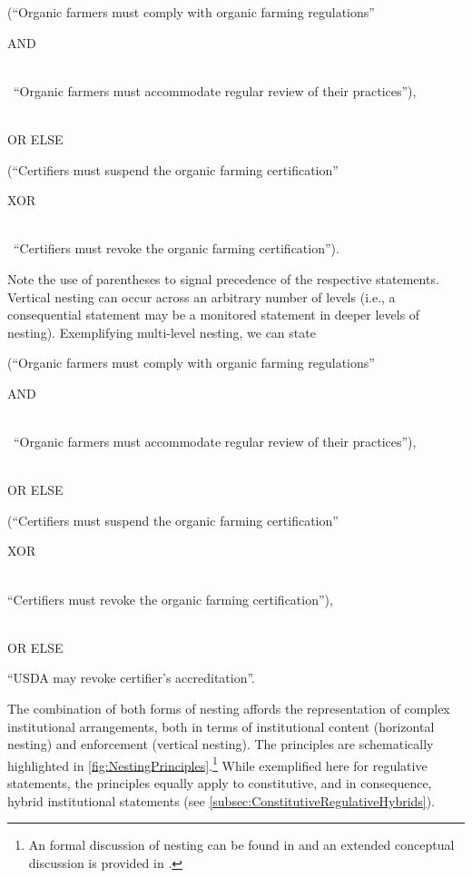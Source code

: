 \begin{exa}(``Organic farmers must comply with organic farming regulations'' \begin{hil}AND\end{hil}\\
\-\hspace{0.43cm}\ ``Organic farmers must accommodate regular review of their practices''), \\
\-\hspace{1.5cm}\ \begin{hil}OR ELSE\end{hil} (``Certifiers must suspend the organic farming certification'' \begin{hil}XOR\end{hil} \\ 
\-\hspace{3.6cm}\ ``Certifiers must revoke the organic farming certification'').\end{exa} Note the use of parentheses to signal precedence of the respective statements. 
Vertical nesting can occur across an arbitrary number of levels (i.e., a consequential statement may be a monitored statement in deeper levels of nesting). Exemplifying multi-level nesting, we can state 
\begin{exa}(``Organic farmers must comply with organic farming regulations'' \begin{hil}AND\end{hil}\\
\-\hspace{0.43cm}\ ``Organic farmers must accommodate regular review of their practices''), \\ 
\-\hspace{1.5cm}\ \begin{hil}OR ELSE\end{hil} (``Certifiers must suspend the organic farming certification'' \begin{hil}XOR\end{hil} \\
\-\hspace{3.8cm}``Certifiers must revoke the organic farming certification''),\\ 
\-\hspace{3cm}\ \begin{hil}OR ELSE\end{hil} ``USDA may revoke certifier’s accreditation''.\end{exa}

The combination of both forms of nesting affords the representation of complex institutional arrangements, both in terms of institutional content (horizontal nesting) and enforcement (vertical nesting). The principles are schematically highlighted in \cref{fig:NestingPrinciples}.\footnote{An formal discussion of nesting can be found in \citet{Frantz2013} and an extended conceptual discussion is provided in \citep{Frantz2022InstitutionalGrammar}.} While exemplified here for regulative statements, the principles equally apply to constitutive, and in consequence, hybrid institutional statements (see \cref{subsec:ConstitutiveRegulativeHybrids}).

